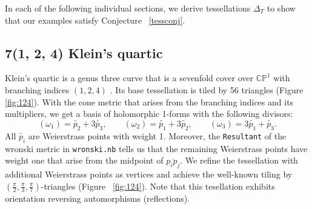 \documentclass[12pt,reqno]{amsart}
\theoremstyle{definition}
\theoremstyle{remark}
\begin{document}
In each of the following individual sections, we derive tessellations $\Delta_T$ to show that our examples satisfy Conjecture ~\ref{tessconj}.



\subsection*{7(1, 2, 4) Klein's quartic } 



Klein's quartic is a genus three curve that is a sevenfold cover over $\mathbb{C}\mathbb{P}^1$ with branching indices $(1,2,4)$ \cite{kw}. Its base tessellation is tiled by 56 triangles (Figure~ \cref{fig:124}). With the cone metric that arises from the branching indices and its multipliers, we get a basis of holomorphic 1-forms with the following divisors: $$(\omega_1) = \widetilde{p_2} + 3 \widetilde{p_3}, \qquad (\omega_2) = \widetilde{p_1} + 3 \widetilde{p_2}, \qquad (\omega_3) = 3 \widetilde{p_1} + \widetilde{p_3}.$$ All $\widetilde{p_i}$ are Weierstrass points with weight 1. Moreover, the \texttt{Resultant} of the wronski metric in \texttt{wronski.nb} tells us that the remaining Weierstrass points have weight one that arise from the midpoint of $\overline{p_i p_j}.$ We refine the tessellation with additional Weierstrass points as vertices and achieve the well-known tiling by $(\frac{\pi}{2}, \frac{\pi}{3}, \frac{\pi}{7})$-triangles (Figure~ \cref{fig:124}). Note that this tesellation exhibits orientation reversing automorphisms (reflections). 
\end{document}
